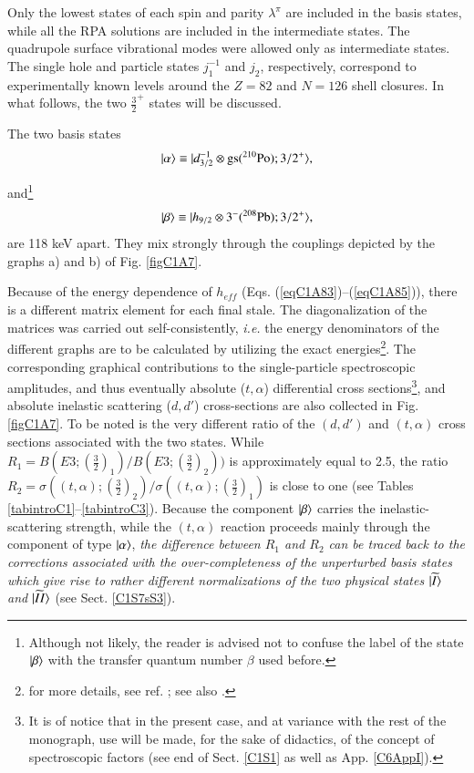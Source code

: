 Only the lowest states of each spin and parity $\lambda^{\pi}$ are included in the basis states, while all the RPA solutions are included in the intermediate states. The quadrupole surface vibrational modes were allowed only as intermediate states. The single hole and particle states $j_1^{-1}$ and $j_2$, respectively, correspond to experimentally known levels around the $Z = 82$ and $N=126$ shell closures.  
In what follows, the  two $\frac{3}{2}^+$ states will be discussed.

The two basis states 
  \begin{align}\label{eqC1A89} 
   |{\alpha} \rangle\equiv |{d_{3/2}^{-1}\otimes \text{gs}(^{210}\text{Po});3/2^+} \rangle,
    \end{align} 


and\footnote{Although not likely, the reader is advised not to confuse the label of the state $|{\beta} \rangle$ with the transfer quantum number $\beta$ used before.}
  \begin{align}\label{eqC1A90} 
      |{\beta} \rangle\equiv |{h_{9/2}\otimes 3^-(^{208}\text{Pb});3/2^+} \rangle,
    \end{align} 
are 118 keV apart. They mix strongly through the couplings depicted by the graphs a) and b) of Fig. \ref{figC1A7}. 


Because of the energy dependence of $h_{eff}$ (Eqs. (\ref{eqC1A83})--(\ref{eqC1A85})), there is a different matrix element 
for each final stale. The diagonalization of the matrices was carried out self-consistently, \textit{i.e.} the energy denominators of the different graphs are to be calculated by utilizing the exact energies\footnote{for more details, see ref. \cite{Bortignon:77}; see also \cite{Bortignon:76}.}. 
The corresponding graphical contributions to the single-particle spectroscopic amplitudes, and thus eventually absolute ($t,\alpha$) differential cross sections\footnote{It is of notice that in the present case, and at variance with the rest of the monograph, use will be made, for the sake of  didactics, of the concept of spectroscopic factors (see end of Sect. \ref{C1S1} as well as App. \ref{C6AppI}).}, and absolute inelastic scattering ($d,d'$) cross-sections are also collected in Fig. \ref{figC1A7}. To be noted is the very different ratio of the $(d,d')$ and $(t,\alpha)$ cross sections associated with the two states. While $R_1=B(E3;(\frac{3}{2})_1)/B(E3;(\frac{3}{2})_2))$ is approximately equal to 2.5, the ratio $R_2=\sigma((t,\alpha);(\frac{3}{2})_2)/\sigma((t,\alpha);(\frac{3}{2})_1)$ is close to one (see Tables \ref{tabintroC1}--\ref{tabintroC3}). Because the component $|{\beta} \rangle$ carries the inelastic-scattering strength, while the $(t,\alpha)$ reaction proceeds mainly through the component of type $|{\alpha} \rangle$, \textit{the difference between $R_1$ and $R_2$ can be traced back to the corrections associated with the over-completeness of the unperturbed basis states which give rise to rather different normalizations of the two physical states $|{\widetilde I} \rangle$ and $|{\widetilde {II}} \rangle$} (see Sect.   \ref{C1S7sS3}). 


